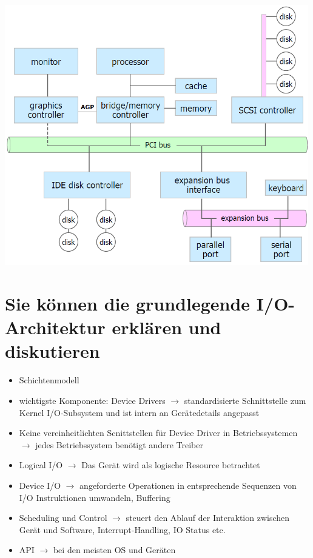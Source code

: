 \documentclass{report}
\newenvironment{Figure}
	{\par\medskip\noindent\minipage{\linewidth}}
	{\endminipage\par\medskip}
\theoremstyle{definition}
\theoremstyle{example}
\begin{document}
\begin{Figure}
\centering
\includegraphics[width=500px]{img/PCArchitektur.png}
	\label{fig:Abbildung eines PC Architektur}
\end{Figure}

\section{Sie können die grundlegende I/O-Architektur erklären und diskutieren}
\begin{itemize}
	\item Schichtenmodell
	\item wichtigste Komponente: Device Drivers $\rightarrow$ standardisierte Schnittstelle zum Kernel I/O-Subsystem und ist intern an Gerätedetails angepasst
	\item Keine vereinheitlichten Scnittstellen für Device Driver in Betriebssystemen $\rightarrow$ jedes Betriebssystem benötigt andere Treiber
	\item Logical I/O $\rightarrow$ Das Gerät wird als logische Resource betrachtet
	\item Device I/O $\rightarrow$ angeforderte Operationen in entsprechende Sequenzen von I/O Instruktionen umwandeln, Buffering
	\item Scheduling und Control $\rightarrow$ steuert den Ablauf der Interaktion zwischen Gerät und Software, Interrupt-Handling, IO Status etc.
	\item API $\rightarrow$ bei den meisten OS und Geräten
\end{itemize}
\end{document}
